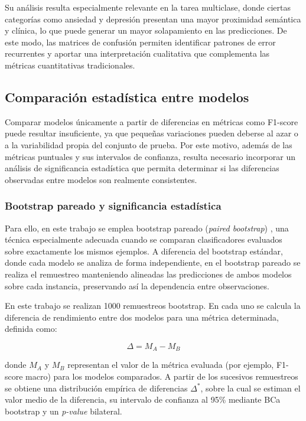 Su análisis resulta especialmente relevante en la tarea multiclase, donde ciertas categorías como ansiedad y depresión presentan una mayor proximidad semántica y clínica, lo que puede generar un mayor solapamiento en las predicciones. De este modo, las matrices de confusión permiten identificar patrones de error recurrentes y aportar una interpretación cualitativa que complementa las métricas cuantitativas tradicionales.

\subsection{Comparación estadística entre modelos}

Comparar modelos únicamente a partir de diferencias en métricas como F1-score puede resultar insuficiente, ya que pequeñas variaciones pueden deberse al azar o a la variabilidad propia del conjunto de prueba. Por este motivo, además de las métricas puntuales y sus intervalos de confianza, resulta necesario incorporar un análisis de significancia estadística que permita determinar si las diferencias observadas entre modelos son realmente consistentes.

\subsubsection{Bootstrap pareado y significancia estadística}

Para ello, en este trabajo se emplea bootstrap pareado (\textit{paired bootstrap}) \cite{efron_introduction_1994}\cite{davison_bootstrap_1997}, una técnica especialmente adecuada cuando se comparan clasificadores evaluados sobre exactamente los mismos ejemplos. A diferencia del bootstrap estándar, donde cada modelo se analiza de forma independiente, en el bootstrap pareado se realiza el remuestreo manteniendo alineadas las predicciones de ambos modelos sobre cada instancia, preservando así la dependencia entre observaciones.

En este trabajo se realizan 1000 remuestreos bootstrap. En cada uno se calcula la diferencia de rendimiento entre dos modelos para una métrica determinada, definida como:

\[
\Delta = M_A - M_B
\]

donde \(M_A\) y \(M_B\) representan el valor de la métrica evaluada (por ejemplo, F1-score macro) para los modelos comparados. A partir de los sucesivos remuestreos se obtiene una distribución empírica de diferencias \(\Delta^{*}\), sobre la cual se estiman el valor medio de la diferencia, su intervalo de confianza al 95\% mediante \ac{BCa} bootstrap y un \textit{p-value} bilateral.

